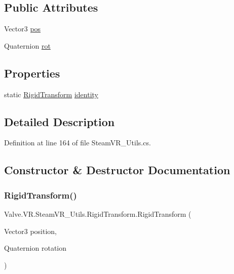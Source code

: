 \subsection*{Public Attributes}
\begin{DoxyCompactItemize}
\item 
Vector3 \mbox{\hyperlink{struct_valve_1_1_v_r_1_1_steam_v_r___utils_1_1_rigid_transform_a3cb425c3e4537084be54855b6651044e}{pos}}
\item 
Quaternion \mbox{\hyperlink{struct_valve_1_1_v_r_1_1_steam_v_r___utils_1_1_rigid_transform_aa5b8421bf162f9e958f753e08e24d584}{rot}}
\end{DoxyCompactItemize}
\subsection*{Properties}
\begin{DoxyCompactItemize}
\item 
static \mbox{\hyperlink{struct_valve_1_1_v_r_1_1_steam_v_r___utils_1_1_rigid_transform}{Rigid\+Transform}} \mbox{\hyperlink{struct_valve_1_1_v_r_1_1_steam_v_r___utils_1_1_rigid_transform_a04aebe27625a29b885052af12c0dcf36}{identity}}
\end{DoxyCompactItemize}


\subsection{Detailed Description}


Definition at line 164 of file Steam\+V\+R\+\_\+\+Utils.\+cs.



\subsection{Constructor \& Destructor Documentation}
\mbox{\label{struct_valve_1_1_v_r_1_1_steam_v_r___utils_1_1_rigid_transform_ac607cc418aa0f6395d0e063fe445ce6f}} 
\subsubsection{\texorpdfstring{RigidTransform()}{RigidTransform()}\hspace{0.1cm}{\footnotesize\ttfamily [1/5]}}
{\footnotesize\ttfamily Valve.\+V\+R.\+Steam\+V\+R\+\_\+\+Utils.\+Rigid\+Transform.\+Rigid\+Transform (\begin{DoxyParamCaption}\item[{Vector3}]{position,  }\item[{Quaternion}]{rotation }\end{DoxyParamCaption})}



